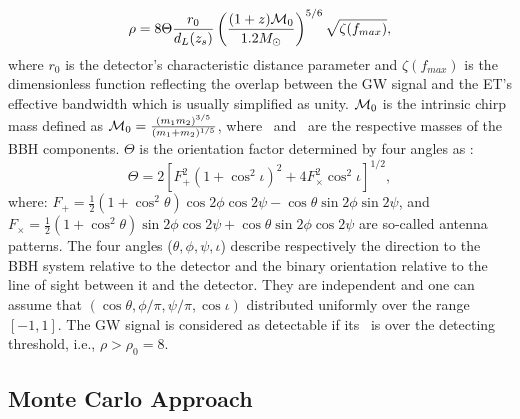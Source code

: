 \documentclass[twocolumn]{aastex62}
\begin{document}
\begin{equation} \label{SNR}
\rho = 8 \Theta \frac{r_0}{d_L(z_s)} \left( \frac{(1+z){\cal M}_0}{1.2 M_{\odot}} \right)^{5/6}
\sqrt {\zeta(f_{max})},
\end{equation}
where $r_0$ is the detector's characteristic distance parameter and $\zeta(f_{max})$ is the dimensionless function reflecting the overlap between the GW signal and the ET's effective bandwidth which is usually simplified as unity. ${\cal M}_0$ is the intrinsic chirp mass defined as $ {\cal M}_0 = \frac{(m_1m_2)^{3/5}}{(m_1+m_2)^{1/5}}$, where \mone\ and \mtwo\ are the
respective masses of the BBH components. $\Theta$ is the orientation factor determined by four angles as \citep{Finn93}:
 \begin{equation} \label{Theta}
 \Theta = 2 [ F_{+}^2(1 + \cos^2{\iota} )^2 + 4 F_{\times}^2 \cos^2{\iota} ]^{1/2},
 \end{equation}
where: $F_{+} = \frac{1}{2} (1 + \cos^2{\theta}) \cos{2\phi} \cos{2 \psi} - \cos{\theta} \sin{2 \phi} \sin{ 2 \psi}$, and
$F_{\times} = \frac{1}{2} (1 + \cos^2{\theta}) \sin{2\phi} \cos{2 \psi} + \cos{\theta} \sin{2 \phi} \cos{ 2 \psi}$ are so-called antenna patterns. The four angles ($\theta, \phi, \psi, \iota$) describe respectively the
direction to the BBH system relative to the detector and the binary orientation relative to the line of sight between it and the detector. 
They are independent and one can assume that $(\cos\theta, \phi/\pi, \psi/\pi, \cos\iota)$ distributed uniformly over the range $[-1, 1]$. The GW signal is considered as detectable if its \snr\ is over the detecting threshold, i.e., $\rho > \rho_0 = 8$.

\subsection{Monte Carlo Approach} \label{MC}
\end{document}
